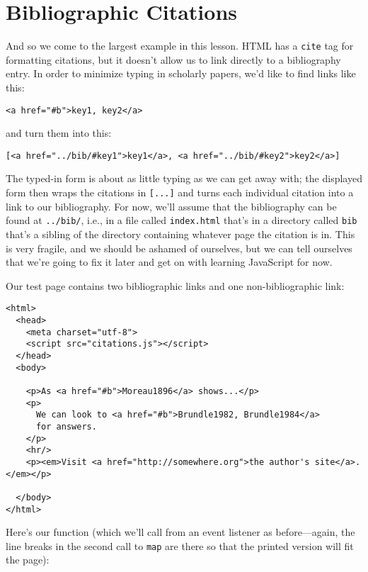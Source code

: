 \section{Bibliographic Citations}\label{s:pages-citations}

And so we come to the largest example in this lesson.
HTML has a \texttt{cite} tag for formatting citations,
but it doesn't allow us to link directly to a bibliography entry.
In order to minimize typing in scholarly papers,
we'd like to find links like this:

\begin{verbatim}
<a href="#b">key1, key2</a>
\end{verbatim}

\noindent
and turn them into this:

\begin{verbatim}
[<a href="../bib/#key1">key1</a>, <a href="../bib/#key2">key2</a>]
\end{verbatim}

The typed-in form is about as little typing as we can get away with;
the displayed form then wraps the citations in \texttt{[...]}
and turns each individual citation into a link to our bibliography.
For now,
we'll assume that the bibliography can be found at \texttt{../bib/},
i.e.,
in a file called \texttt{index.html} that's in a directory called \texttt{bib}
that's a sibling of the directory containing whatever page the citation is in.
This is very fragile,
and we should be ashamed of ourselves,
but we can tell ourselves that we're going to fix it later
and get on with learning JavaScript for now.

Our test page contains two bibliographic links
and one non-bibliographic link:

\begin{verbatim}
<html>
  <head>
    <meta charset="utf-8">
    <script src="citations.js"></script>
  </head>
  <body>

    <p>As <a href="#b">Moreau1896</a> shows...</p>
    <p>
      We can look to <a href="#b">Brundle1982, Brundle1984</a>
      for answers.
    </p>
    <hr/>
    <p><em>Visit <a href="http://somewhere.org">the author's site</a>.</em></p>
    
  </body>
</html>
\end{verbatim}

\noindent
Here's our function
(which we'll call from an event listener as before---again,
the line breaks in the second call to \texttt{map} are there
so that the printed version will fit the page):

